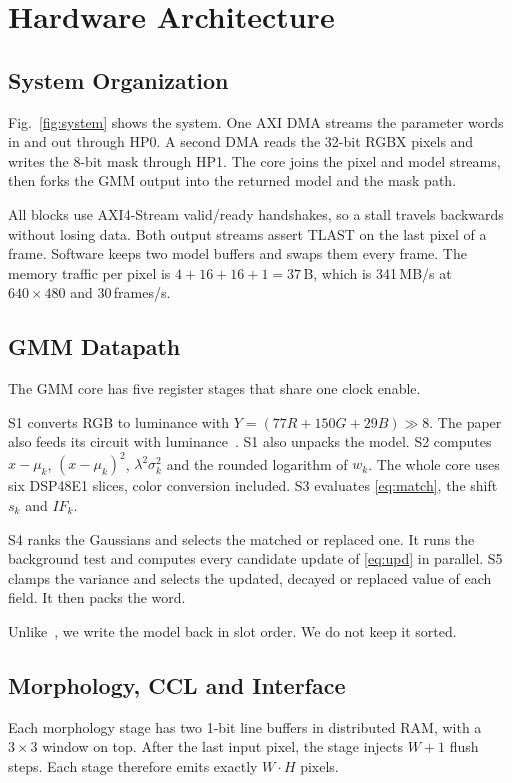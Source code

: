 \documentclass[conference]{IEEEtran}
\begin{document}
\section{Hardware Architecture}

\subsection{System Organization}
Fig.~\ref{fig:system} shows the system. One AXI DMA streams the parameter words
in and out through HP0. A second DMA reads the 32-bit RGBX pixels and writes the
8-bit mask through HP1. The core joins the pixel and model streams, then forks
the GMM output into the returned model and the mask path.

All blocks use AXI4-Stream valid/ready handshakes, so a stall travels backwards
without losing data. Both output streams assert TLAST on the last pixel of a
frame. Software keeps two model buffers and swaps them every frame. The memory
traffic per pixel is $4+16+16+1=37$\,B, which is 341\,MB/s at $640\times480$
and 30\,frames/s.

\subsection{GMM Datapath}
The GMM core has five register stages that share one clock enable.

S1 converts RGB to luminance with $Y=(77R+150G+29B)\gg 8$. The paper also feeds
its circuit with luminance~\cite{genovese2014}. S1 also unpacks the model. S2
computes $x-\mu_k$, $(x-\mu_k)^2$, $\lambda^2\sigma_k^2$ and the rounded
logarithm of $w_k$. The whole core uses six DSP48E1 slices, color conversion
included. S3 evaluates \eqref{eq:match}, the shift $s_k$ and $IF_k$.

S4 ranks the Gaussians and selects the matched or replaced one. It runs the
background test and computes every candidate update of \eqref{eq:upd} in
parallel. S5 clamps the variance and selects the updated, decayed or replaced
value of each field. It then packs the word.

Unlike~\cite{genovese2014}, we write the model back in slot order. We do not keep
it sorted.

\subsection{Morphology, CCL and Interface}
Each morphology stage has two 1-bit line buffers in distributed RAM, with a
$3\times3$ window on top. After the last input pixel, the stage injects $W+1$
flush steps. Each stage therefore emits exactly $W\cdot H$ pixels.
\end{document}
